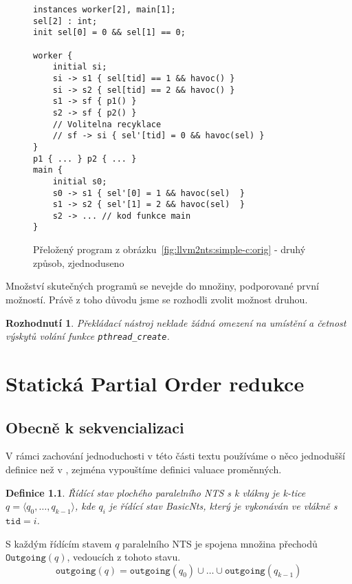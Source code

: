 \documentclass[10pt,a4paper,notitlepage]{report}
\newtheorem{definition}{Definice}
\newtheorem{decision}{Rozhodnutí}
\newcommand{\tuple}[1]{\langle #1 \rangle}
\begin{document}
\begin{figure}[h]
\begin{lstlisting}
instances worker[2], main[1];
sel[2] : int;
init sel[0] = 0 && sel[1] == 0;

worker {
	initial si;
	si -> s1 { sel[tid] == 1 && havoc() }
	si -> s2 { sel[tid] == 2 && havoc() }
	s1 -> sf { p1() }
	s2 -> sf { p2() }
	// Volitelna recyklace
	// sf -> si { sel'[tid] = 0 && havoc(sel) }
}
p1 { ... } p2 { ... }
main {
	initial s0;
	s0 -> s1 { sel'[0] = 1 && havoc(sel)  }
	s1 -> s2 { sel'[1] = 2 && havoc(sel)  }
	s2 -> ... // kod funkce main
}
\end{lstlisting}
\caption{Přeložený program z obrázku~\ref{fig:llvm2nts:simple-c:orig} - druhý způsob, zjednoduseno}
\label{fig:llvm2nts:simple-c:realworld-nts}
\end{figure}


Množství skutečných programů se nevejde do množiny, podporované první možností. Právě z toho důvodu jsme se rozhodli zvolit možnost druhou.

\begin{decision}\label{decision:real-world-programs}
Překládací nástroj neklade žádná omezení na umístění a četnost výskytů volání funkce \texttt{pthread\_create}.
\end{decision}




\chapter{Statická Partial Order redukce}

\section{Obecně k sekvencializaci}
V rámci zachování jednoduchosti v této části textu používáme o něco jednodušší definice než v \cite{NTSref}, zejména vypouštíme definici valuace proměnných.

\begin{definition}
Řídící stav plochého paralelního NTS s k vlákny je k-tice $q = \tuple{q_0, \ldots, q_{k-1}}$, kde $q_i$ je řídící stav BasicNts, který je vykonáván ve vlákně s $\texttt{tid} = i$.
\end{definition}
S každým řídícím stavem $q$ paralelního NTS je spojena množina přechodů $\texttt{Outgoing}(q)$, vedoucích z tohoto stavu.
\begin{equation}
\texttt{outgoing}(q) = \texttt{outgoing}(q_0) \cup \ldots \cup \texttt{outgoing}(q_{k-1})
\end{equation}
\end{document}
